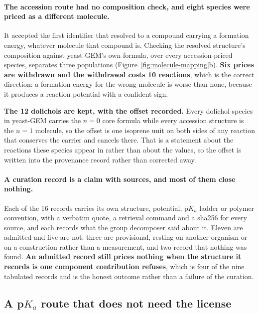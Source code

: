\paragraph{The accession route had no composition check, and eight species were priced as a
different molecule.} It accepted the first identifier that resolved to a compound carrying
a formation energy, whatever molecule that compound is. Checking the resolved structure's
composition against yeast-GEM's own formula, over every accession-priced species, separates
three populations (Figure~\ref{fig:molecule-mapping}b). \textbf{Six prices are withdrawn and
the withdrawal costs 10 reactions}, which is the correct direction: a formation energy for
the wrong molecule is worse than none, because it produces a reaction potential with a
confident sign.



\textbf{The 12 dolichols are kept, with the offset recorded.} Every dolichol species in
yeast-GEM carries the $n = 0$ core formula while every accession structure is the $n = 1$
molecule, so the offset is one isoprene unit on both sides of any reaction that conserves
the carrier and cancels there. That is a statement about the reactions these species appear
in rather than about the values, so the offset is written into the provenance record rather
than corrected away.

\paragraph{A curation record is a claim with sources, and most of them close nothing.} Each
of the 16 records carries its own structure, potential, p$K_a$ ladder or polymer convention,
with a verbatim quote, a retrieval command and a sha256 for every source, and each records
what the group decomposer said about it. Eleven are admitted and five are not: three are
provisional, resting on another organism or on a construction rather than a measurement, and
two record that nothing was found. \textbf{An admitted record still prices nothing when the
structure it records is one component contribution refuses}, which is four of the nine
tabulated records and is the honest outcome rather than a failure of the curation.



\subsection{A p$K_a$ route that does not need the license}
\label{sec:pka}

